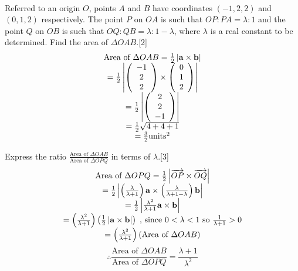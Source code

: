 \documentclass[12pt, a4 paper]{article}
\begin{document}
\begin{outline}[enumerate]
\begin{align*}
					\end{align*}

					\color{black}
					\1 Referred to an origin $O$, points $A$ and $B$ have coordinates $(-1,2,2)$ and $(0,1,2)$ respectively. The point $P$ on $OA$ is such that $OP:PA = \lambda :1$ and the point $Q$ on $OB$ is such that $OQ:QB = \lambda :1 - \lambda $, where $\lambda $ is a real constant to be determined.
					\2 Find the area of $\Delta OAB$.\hfill[2]
					\color{blue}
					\[\begin{array}{c}{\textrm{Area of }}\Delta OAB = \frac{1}{2}\left| {{\bf{a}} \times {\bf{b}}} \right|\\ = \frac{1}{2}\left| {\left( {\begin{array}{*{20}{c}}{ - 1}\\2\\2\end{array}} \right) \times \left( {\begin{array}{*{20}{c}}0\\1\\2\end{array}} \right)} \right|\\ = \frac{1}{2}\left| {\left( {\begin{array}{*{20}{c}}2\\2\\{ - 1}\end{array}} \right)} \right|\\ = \frac{1}{2}\sqrt {4 + 4 + 1} \\ = \frac{3}{2}{\textrm{unit}}{{\textrm{s}}^2}\end{array}\]

					\color{black}
					\2 Express the ratio $\frac{{{\textrm{Area of }}\Delta OAB}}{{{\textrm{Area of }}\Delta OPQ}}$ in terms of $\lambda $.\hfill[3]
					\color{blue}
					\[\begin{array}{c}{\textrm{Area of }}\Delta OPQ = \frac{1}{2}\left| {\overrightarrow {OP}  \times \overrightarrow {OQ} } \right|\\ = \frac{1}{2}\left| {\left( {\frac{\lambda }{{\lambda  + 1}}} \right){\bf{a}} \times \left( {\frac{\lambda }{{\lambda  + 1 - \lambda }}} \right){\bf{b}}} \right|\\ = \frac{1}{2}\left| {\frac{{{\lambda ^2}}}{{\lambda  + 1}}{\bf{a}} \times {\bf{b}}} \right|\\ = \left( {\frac{{{\lambda ^2}}}{{\lambda  + 1}}} \right)\left( {\frac{1}{2}\left| {{\bf{a}} \times {\bf{b}}} \right|} \right)\;{\textrm{, since }}0 < \lambda  < 1{\textrm{ so }}\frac{1}{{\lambda  + 1}} > 0\\ = \left( {\frac{{{\lambda ^2}}}{{\lambda  + 1}}} \right)\left( {{\textrm{Area of }}\Delta OAB} \right)\end{array}\]
					\[\therefore \frac{{{\textrm{Area of }}\Delta OAB}}{{{\textrm{Area of }}\Delta OPQ}} = \frac{{\lambda  + 1}}{{{\lambda ^2}}}\]



\end{outline}
\end{document}
